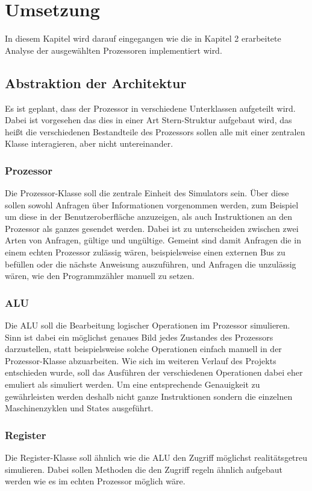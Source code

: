 \documentclass[12pt]{article}
\begin{document}
\newpage

\section{Umsetzung}
In diesem Kapitel wird darauf eingegangen wie die in Kapitel 2 erarbeitete Analyse der ausgewählten Prozessoren implementiert wird.

\subsection{Abstraktion der Architektur}
Es ist geplant, dass der Prozessor in verschiedene Unterklassen aufgeteilt wird. Dabei ist vorgesehen das dies in einer Art Stern-Struktur aufgebaut wird, das heißt die verschiedenen Bestandteile des Prozessors sollen alle mit einer zentralen Klasse interagieren, aber nicht untereinander.

\subsubsection{Prozessor}
Die Prozessor-Klasse soll die zentrale Einheit des Simulators sein. Über diese sollen sowohl Anfragen über Informationen vorgenommen werden, zum Beispiel um diese in der Benutzeroberfläche anzuzeigen, als auch Instruktionen an den Prozessor als ganzes gesendet werden. Dabei ist zu unterscheiden zwischen zwei Arten von Anfragen, gültige und ungültige. Gemeint sind damit Anfragen die in einem echten Prozessor zulässig wären, beispielsweise einen externen Bus zu befüllen oder die nächste Anweisung auszuführen, und Anfragen die unzulässig wären, wie den Programmzähler manuell zu setzen.

\subsubsection{ALU}
Die ALU soll die Bearbeitung logischer Operationen im Prozessor simulieren. Sinn ist dabei ein möglichst genaues Bild jedes Zustandes des Prozessors darzustellen, statt beispielsweise solche Operationen einfach manuell in der Prozessor-Klasse abzuarbeiten. Wie sich im weiteren Verlauf des Projekts entschieden wurde, soll das Ausführen der verschiedenen Operationen dabei eher emuliert als simuliert werden. Um eine entsprechende Genauigkeit zu gewährleisten werden deshalb nicht ganze Instruktionen sondern die einzelnen Maschinenzyklen und States ausgeführt.

\subsubsection{Register}
Die Register-Klasse soll ähnlich wie die ALU den Zugriff möglichst realitätsgetreu simulieren. Dabei sollen Methoden die den Zugriff regeln ähnlich aufgebaut werden wie es im echten Prozessor möglich wäre.
\end{document}
